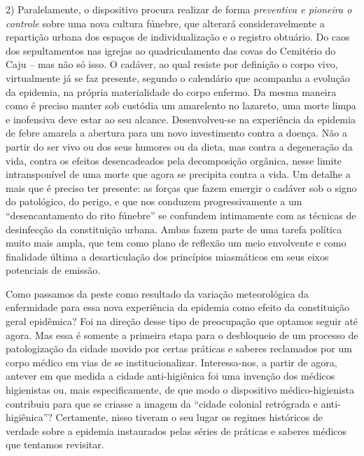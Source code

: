 2) Paralelamente, o dispositivo procura realizar de forma
\emph{preventiva e pioneira o controle} sobre uma nova cultura fúnebre,
que alterará consideravelmente a repartição urbana dos espaços de
individualização e o registro obtuário. Do caos dos sepultamentos nas
igrejas ao quadriculamento das covas do Cemitério do Caju -- mas não só
isso. O cadáver, ao qual resiste por definição o corpo vivo,
virtualmente já se faz presente, segundo o calendário que acompanha a
evolução da epidemia, na própria materialidade do corpo enfermo. Da
mesma maneira como é preciso manter sob custódia um amarelento no
lazareto, uma morte limpa e inofensiva deve estar ao seu alcance.
Desenvolveu-se na experiência da epidemia de febre amarela a abertura
para um novo investimento contra a doença. Não a partir do ser vivo ou
dos seus humores ou da dieta, mas contra a degeneração da vida, contra
os efeitos desencadeados pela decomposição orgânica, nesse limite
intransponível de uma morte que agora se precipita contra a vida. Um
detalhe a mais que é preciso ter presente: as forças que fazem emergir o
cadáver sob o signo do patológico, do perigo, e que nos conduzem
progressivamente a um ``desencantamento do rito fúnebre'' se confundem
intimamente com as técnicas de desinfecção da constituição urbana. Ambas
fazem parte de uma tarefa política muito mais ampla, que tem como plano
de reflexão um meio envolvente e como finalidade última a desarticulação
dos princípios miasmáticos em seus eixos potenciais de emissão.

Como passamos da peste como resultado da variação meteorológica da
enfermidade para essa nova experiência da epidemia como efeito da
constituição geral epidêmica? Foi na direção desse tipo de preocupação
que optamos seguir até agora. Mas essa é somente a primeira etapa para o
desbloqueio de um processo de patologização da cidade movido por certas
práticas e saberes reclamados por um corpo médico em vias de se
institucionalizar. Interessa-nos, a partir de agora, antever em que
medida a cidade anti-higiênica foi uma invenção dos médicos higienistas
ou, mais especificamente, de que modo o dispositivo médico-higienista
contribuiu para que se criasse a imagem da ``cidade colonial retrógrada
e anti-higiênica''? Certamente, nisso tiveram o seu lugar os regimes
históricos de verdade sobre a epidemia instaurados pelas séries de
práticas e saberes médicos que tentamos revisitar.

